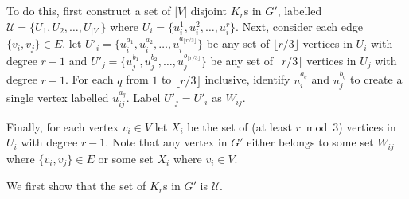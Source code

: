 To do this, first construct a set of $|V|$ disjoint $K_r$s in $G'$, labelled $\mathcal{U} = \{ U_1, U_2, \dots, U_{|V|} \}$ where $U_i = \{ u_i^1, u_i^2, \dots, u_i^r \}$. Next, consider each edge $\{ v_i, v_j \} \in E$. let $U'_i = \{ u_i^{a_1}, u_i^{a_2}, \dots, u_i^{a_{\lfloor r/3 \rfloor}} \}$ be any set of $\lfloor r/3 \rfloor$ vertices in $U_i$ with degree $r-1$ and $U'_j = \{ u_j^{b_1}, u_j^{b_2}, \dots, u_j^{b_{\lfloor r/3 \rfloor}} \}$ be any set of $\lfloor r/3 \rfloor$ vertices in $U_j$ with degree $r-1$. For each $q$ from $1$ to $\lfloor r/3 \rfloor$ inclusive, identify $u_i^{a_q}$ and $u_j^{b_q}$ to create a single vertex labelled $u_{ij}^{a_q}$. Label $U'_j = U'_i$ as $W_{ij}$. %

Finally, for each vertex $v_i \in V$ let $X_i$ be the set of (at least $r \bmod 3$) vertices in $U_i$ with degree $r-1$. Note that any vertex in $G'$ either belongs to some set $W_{ij}$ where $\{ v_i, v_j \} \in E$ or some set $X_i$ where $v_i \in V$.

We first show that the set of $K_r$s in $G'$ is $\mathcal{U}$.

